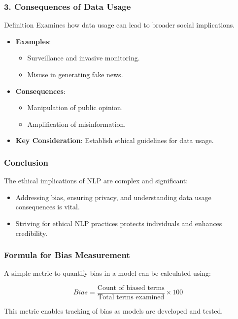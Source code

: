 \documentclass[aspectratio=169]{beamer}
\begin{document}
\begin{frame}[fragile]
    \frametitle{3. Consequences of Data Usage}
    \begin{block}{Definition}
        Examines how data usage can lead to broader social implications.
    \end{block}

    \begin{itemize}
        \item \textbf{Examples}:
        \begin{itemize}
            \item Surveillance and invasive monitoring.
            \item Misuse in generating fake news.
        \end{itemize}
        
        \item \textbf{Consequences}:
        \begin{itemize}
            \item Manipulation of public opinion.
            \item Amplification of misinformation.
        \end{itemize}
        
        \item \textbf{Key Consideration}: Establish ethical guidelines for data usage.
    \end{itemize}
\end{frame}

\begin{frame}[fragile]
    \frametitle{Conclusion}
    The ethical implications of NLP are complex and significant:
    \begin{itemize}
        \item Addressing bias, ensuring privacy, and understanding data usage consequences is vital.
        \item Striving for ethical NLP practices protects individuals and enhances credibility.
    \end{itemize}
\end{frame}

\begin{frame}[fragile]
    \frametitle{Formula for Bias Measurement}
    A simple metric to quantify bias in a model can be calculated using:

    \begin{equation}
    Bias = \frac{\text{Count of biased terms}}{\text{Total terms examined}} \times 100
    \end{equation}
    
    This metric enables tracking of bias as models are developed and tested.
\end{frame}
\end{document}
